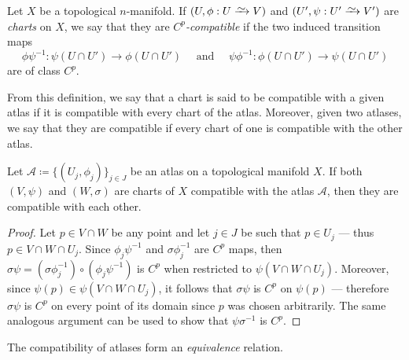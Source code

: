 \begin{definition}
\label{def:compatible-chart}
Let \(X\) be a topological \(n\)-manifold. If \((U, \phi: U \isoto V)\) and
\((U', \psi: U' \isoto V')\) are \emph{charts} on \(X\), we say that they are
\emph{\(C^p\)-compatible} if the two induced transition maps
\[
\phi \psi^{-1}: \psi(U \cap U') \longrightarrow \phi(U \cap U')
\quad\text{ and }\quad
\psi \phi^{-1}: \phi(U \cap U') \longrightarrow \psi(U \cap U')
\]
are of class \(C^p\).

From this definition, we say that a chart is said to be compatible with a given
atlas if it is compatible with every chart of the atlas.  Moreover, given two
atlases, we say that they are compatible if every chart of one is compatible
with the other atlas.
\end{definition}

\begin{lemma}
\label{lem:compatible-charts-with-atlas-are-compatible}
Let \(\mathcal{A} \coloneq \{(U_j, \phi_j)\}_{j \in J}\) be an atlas on a
topological manifold \(X\). If both \((V, \psi)\) and \((W, \sigma)\) are charts
of \(X\) compatible with the atlas \(\mathcal{A}\), then they are compatible
with each other.
\end{lemma}

\begin{proof}
Let \(p \in V \cap W\) be any point and let \(j \in J\) be such that
\(p \in U_j\) --- thus \(p \in V \cap W \cap U_j\). Since \(\phi_j \psi^{-1}\)
and \(\sigma \phi_j^{-1}\) are \(C^p\) maps, then
\(\sigma \psi = (\sigma \phi_j^{-1}) \circ (\phi_j \psi^{-1})\) is \(C^p\) when
restricted to \(\psi(V \cap W \cap U_j)\). Moreover, since
\(\psi(p) \in \psi(V \cap W \cap U_j)\), it follows that \(\sigma \psi\) is
\(C^p\) on \(\psi(p)\) --- therefore \(\sigma \psi\) is \(C^p\) on every point
of its domain since \(p\) was chosen arbitrarily. The same analogous argument
can be used to show that \(\psi \sigma^{-1}\) is \(C^p\).
\end{proof}

\begin{proposition}
\label{prop:compatible-atlas-equivalence-relation}
The compatibility of atlases form an \emph{equivalence} relation.
\end{proposition}

